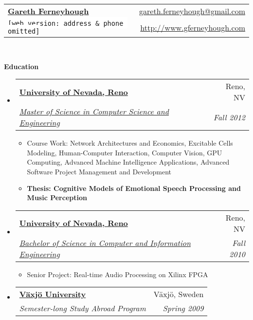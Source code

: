 \documentclass[letterpaper,11pt]{article}
\makeatletter
\newcommand{\resitem}[1]{\item #1 \vspace{-2pt}}
\newcommand{\resheading}[1]{{\large \colorbox{mygrey}{\begin{minipage}{\textwidth}{\textbf{#1 \vphantom{p\^{E}}}}\end{minipage}}}}
\newcommand{\ressubheading}[4]{
\begin{tabular*}{6.5in}{l@{\extracolsep{\fill}}r}
		\textbf{#1} & #2 \\
		\textit{#3} & \textit{#4} \\
\end{tabular*}\vspace{-6pt}}
\makeatother
\begin{document}
\newcommand{\mywebheader}{
\begin{tabular*}{7in}{l@{\extracolsep{\fill}}r}
	\textbf{\href{http://www.gferneyhough.com/}{\LARGE Gareth Ferneyhough}} & \href{mailto:gareth.ferneyhough@gmail.com}{gareth.ferneyhough@gmail.com}\\
	{\footnotesize \texttt{\colorbox{white}{[web version:  address \& phone omitted]}}} & \href{http://www.gferneyhough.com}{http://www.gferneyhough.com} \\
	\end{tabular*}
\\
\vspace{0.1in}}

\mywebheader

\resheading{Education}
	\begin{itemize}
		\item
			\ressubheading{\href{http://www.unr.edu/}{University of Nevada, Reno}}{Reno, NV}{\href{http://www.cse.unr.edu/academics/graduate/cesms.html}{Master of Science in Computer Science and Engineering}}{Fall 2012}
				{ \footnotesize
				\begin{itemize}
				  \resitem{Course Work: Network Architectures and Economics, Excitable Cells Modeling, Human-Computer Interaction, Computer Vision, GPU Computing, Advanced Machine Intelligence Applications, Advanced Software Project Management and Development}  
				  \resitem{\textbf{Thesis: Cognitive Models of Emotional Speech Processing and Music Perception}}
				\end{itemize}
				}
		\item
			\ressubheading{\href{http://www.unr.edu/}{University of Nevada, Reno}}{Reno, NV}{\href{http://www.cse.unr.edu/academics/undergraduate/ciebs.html}{Bachelor of Science in Computer and Information Engineering}}{Fall 2010}
				{ \footnotesize
				\begin{itemize}
				  \resitem{Senior Project: Real-time Audio Processing on Xilinx FPGA}
				\end{itemize}
				}
		\item
			\ressubheading{\href{http://lnu.se/?l=en}{V\"{a}xj\"{o} University}}{V\"{a}xj\"{o}, Sweden}{Semester-long Study Abroad Program}{Spring 2009}
	\end{itemize} %
\end{document}
